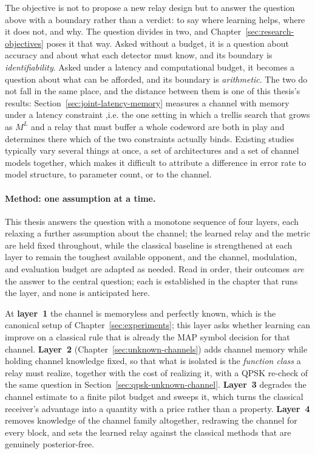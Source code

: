 The objective is not to propose a new relay design but to answer the question above with a boundary rather than a verdict: to say where learning helps, where it does not, and why. The question divides in two, and Chapter~\ref{sec:research-objectives} poses it that way. Asked without a budget, it is a question about accuracy and about what each detector must know, and its boundary is \emph{identifiability}. Asked under a latency and computational budget, it becomes a question about what can be afforded, and its boundary is \emph{arithmetic}. The two do not fall in the same place, and the distance between them is one of this thesis's results: Section~\ref{sec:joint-latency-memory} measures a channel with memory under a latency constraint ,i.e. the one setting in which a trellis search that grows as $M^{L}$ and a relay that must buffer a whole codeword are both in play and determines there which of the two constraints actually binds. Existing studies typically vary several things at once, a set of architectures and a set of channel models together, which makes it difficult to attribute a difference in error rate to model structure, to parameter count, or to the channel.

\paragraph{Method: one assumption at a time.} This thesis answers the question with a monotone sequence of four layers, each relaxing a further assumption about the channel; the learned relay and the metric are held fixed throughout, while the classical baseline is strengthened at each layer to remain the toughest available opponent, and the channel, modulation, and evaluation budget are adapted as needed. Read in order, their outcomes \emph{are} the answer to the central question; each is established in the chapter that runs the layer, and none is anticipated here.

At \textbf{layer~1} the channel is memoryless and perfectly known, which is the canonical setup of Chapter~\ref{sec:experiments}; this layer asks whether learning can improve on a classical rule that is already the MAP symbol decision for that channel. \textbf{Layer~2} (Chapter~\ref{sec:unknown-channels}) adds channel memory while holding channel knowledge fixed, so that what is isolated is the \emph{function class} a relay must realize, together with the cost of realizing it, with a QPSK re-check of the same question in Section~\ref{sec:qpsk-unknown-channel}. \textbf{Layer~3} degrades the channel estimate to a finite pilot budget and sweeps it, which turns the classical receiver's advantage into a quantity with a price rather than a property. \textbf{Layer~4} removes knowledge of the channel family altogether, redrawing the channel for every block, and sets the learned relay against the classical methods that are genuinely posterior-free.

